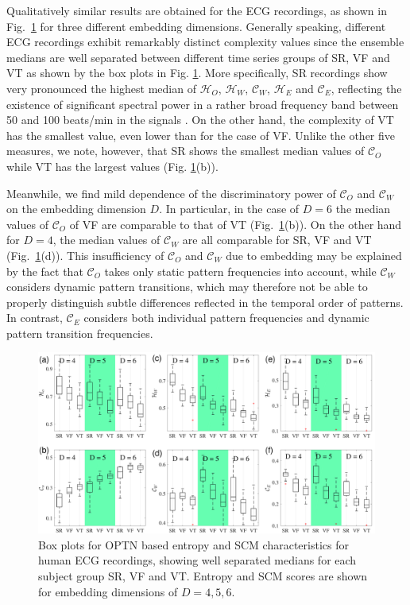\documentclass[aip,cha,reprint,nofootinbib]{revtex4-1}
\begin{document}
Qualitatively similar results are obtained for the ECG recordings, as shown in Fig.~\ref{fig:ecg} for three different embedding dimensions. Generally speaking, different ECG recordings exhibit remarkably distinct complexity values since the ensemble medians are well separated between different time series groups of SR, VF and VT as shown by the box plots in Fig. \ref{fig:ecg}. More specifically, SR recordings show very pronounced the highest median of $\mathcal{H}_O$, $\mathcal{H}_W$, $\mathcal{C}_W$, $\mathcal{H}_E$ and $\mathcal{C}_E$, reflecting the existence of significant spectral power in a rather broad frequency band between 50 and 100 beats/min in the signals \cite{smallCSF2002}. On the other hand, the complexity of VT has the smallest value, even lower than for the case of VF. Unlike the other five measures, we note, however, that SR shows the smallest median values of $\mathcal{C}_O$ while VT has the largest values (Fig. \ref{fig:ecg}(b)). 

 {\color{red}Meanwhile, we find mild dependence of the discriminatory power of $\mathcal{C}_O$ and $\mathcal{C}_W$ on the embedding dimension $D$. In particular, in the case of $D=6$ the median values of $\mathcal{C}_O$ of VF are comparable to that of VT (Fig.~\ref{fig:ecg}(b)). On the other hand for $D=4$, the median values of $\mathcal{C}_W$ are all comparable for SR, VF and VT (Fig.~\ref{fig:ecg}(d)). This insufficiency of $\mathcal{C}_O$ and $\mathcal{C}_W$ due to embedding may be explained by the fact that $\mathcal{C}_O$ takes only static pattern frequencies into account, while $\mathcal{C}_W$ considers dynamic pattern transitions, which may therefore not be able to properly distinguish subtle differences reflected in the temporal order of patterns. In contrast, $\mathcal{C}_E$ considers both individual pattern frequencies and dynamic pattern transition frequencies. } 
\begin{figure}
	\centering 
	\includegraphics[width=2\columnwidth]{ecgExample.pdf}
\caption{\small{Box plots for OPTN based entropy and SCM characteristics for human ECG recordings, showing well separated medians for each subject group SR, VF and VT. Entropy and SCM scores are shown for embedding dimensions of $D = 4, 5, 6$. } \label{fig:ecg}}
\end{figure}
\end{document}
